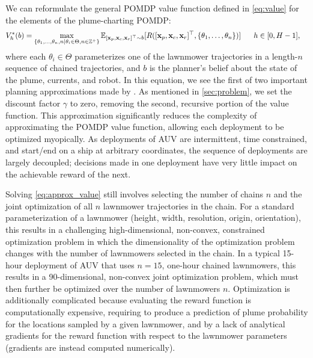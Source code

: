 We can reformulate the general POMDP value function defined in \cref{eq:value} for the elements of the plume-charting POMDP:
\begin{align}
     V_h^{*}(b) &=  \max_{\{\theta_1, \dots, \theta_n, n \mid \theta_i \in \Theta, n \in \mathbb{Z}^+\}} \mathbb{E}_{[\mathbf{x}_{p}, \mathbf{x}_{c}, \mathbf{x}_{r}]^\top \sim b}[R([\mathbf{x}_{p}, \mathbf{x}_{c}, \mathbf{x}_{r}]^\top, \{\theta_1, \dots, \theta_n\})] \hspace{0.6cm} h \in [0, H-1],
    \label{eq:approx_value}
\end{align}
where each $\theta_i \in \Theta$ parameterizes one of the lawnmower trajectories in a length-$n$ sequence of chained trajectories, and $b$ is the planner's belief about the state of the plume, currents, and robot. In this equation, we see the first of two important planning approximations made by \PHORTEX. As mentioned in \cref{sec:problem}, we set the discount factor $\gamma$ to zero, removing the second, recursive portion of the value function. This approximation significantly reduces the complexity of approximating the POMDP value function, allowing each deployment to be optimized myopically. As deployments of AUV \Sentry are intermittent, time constrained, and start/end on a ship at arbitrary coordinates, the sequence of deployments are largely decoupled; decisions made in one deployment have very little impact on the achievable reward of the next.

Solving \cref{eq:approx_value} still involves selecting the number of chains $n$ and the joint optimization of all $n$ lawnmower trajectories in the chain. For a standard parameterization of a lawnmower (height, width, resolution, origin, orientation), this results in a challenging high-dimensional, non-convex, constrained optimization problem in which the dimensionality of the optimization problem changes with the number of lawnmowers selected in the chain. In a typical 15-hour deployment of AUV \Sentry that uses $n=15$, one-hour chained lawnmowers, this results in a 90-dimensional, non-convex joint optimization problem, which must then further be optimized over the number of lawnmowers $n$. Optimization is additionally complicated because evaluating the reward function is computationally expensive, requiring \PHUMES to produce a prediction of plume probability for the locations sampled by a given lawnmower, and by a lack of analytical gradients for the reward function with respect to the lawnmower parameters (gradients are instead computed numerically). 

